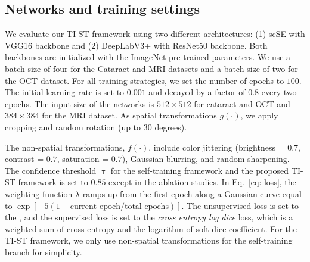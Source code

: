 \subsection{Networks and training settings}
We evaluate our TI-ST framework using two different architectures: (1) scSE with VGG16 backbone and (2) DeepLabV3+ with ResNet50 backbone. Both backbones are initialized with the ImageNet pre-trained parameters. We use a batch size of four for the Cataract and MRI datasets and a batch size of two for the OCT dataset. For all training strategies, we set the number of epochs to $100$. The initial learning rate is set to $0.001$ and decayed by a factor of $0.8$ every two epochs. The input size of the networks is $512\times 512$ for cataract and OCT and $384\times 384$ for the MRI dataset. As spatial transformations $g(\cdot)$, we apply cropping and random rotation (up to 30 degrees). 

The non-spatial transformations, $f(\cdot)$, include color jittering (brightness = $0.7$, contrast = $0.7$, saturation = $0.7$), Gaussian blurring, and random sharpening. The confidence threshold $\uptau$ for the self-training framework and the proposed TI-ST framework is set to $0.85$ except in the ablation studies. In Eq.~\eqref{eq: loss}, the weighting function $\lambda$ ramps up from the first epoch along a Gaussian curve equal to $\exp[-5(1-\text{current-epoch}/{\text{total-epochs}})]$. The unsupervised loss is set to the , and the supervised loss is set to the \textit{cross entropy log dice} loss, which is a weighted sum of cross-entropy and the logarithm of soft dice coefficient. For the TI-ST framework, we only use non-spatial transformations for the self-training branch for simplicity.

